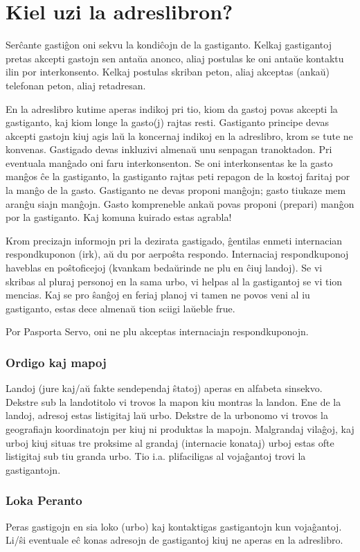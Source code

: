 \section{Kiel uzi la adreslibron?}
Serĉante gastiĝon oni sekvu la kondiĉojn de la gastiganto. Kelkaj gastigantoj pretas
akcepti gastojn sen antaŭa anonco, aliaj postulas ke oni antaŭe kontaktu ilin por
interkonsento. Kelkaj postulas skriban peton, aliaj akceptas (ankaŭ) telefonan
peton, aliaj retadresan.

En la adreslibro kutime aperas indikoj pri tio, kiom da gastoj povas akcepti la
gastiganto, kaj kiom longe la gasto(j) rajtas resti. Gastiganto principe devas akcepti
gastojn kiuj agis laŭ la koncernaj indikoj en la adreslibro, krom se tute ne konvenas.
Gastigado devas inkluzivi almenaŭ unu senpagan tranoktadon. Pri eventuala
manĝado oni faru interkonsenton. Se oni interkonsentas ke la gasto manĝos ĉe
la gastiganto, la gastiganto rajtas peti repagon de la kostoj faritaj por la manĝo
de la gasto. Gastiganto ne devas proponi manĝojn; gasto tiukaze mem aranĝu
siajn manĝojn. Gasto kompreneble ankaŭ povas proponi (prepari) manĝon por la
gastiganto. Kaj komuna kuirado estas agrabla!

Krom precizajn informojn pri la dezirata gastigado, ĝentilas enmeti internacian
respondkuponon (irk), aŭ du por aerpoŝta respondo. Internaciaj respondkuponoj
haveblas en poŝtoficejoj (kvankam bedaŭrinde ne plu en ĉiuj landoj). Se vi skribas
al pluraj personoj en la sama urbo, vi helpas al la gastigantoj se vi tion mencias. Kaj
se pro ŝanĝoj en feriaj planoj vi tamen ne povos veni al iu gastiganto, estas dece
almenaŭ tion sciigi laŭeble frue.

Por Pasporta Servo, oni ne plu akceptas internaciajn respondkuponojn.
\subsubsection{Ordigo kaj mapoj}
Landoj (jure kaj/aŭ fakte sendependaj ŝtatoj) aperas en alfabeta sinsekvo. Dekstre
sub la landotitolo vi trovos la mapon kiu montras la landon.
Ene de la landoj, adresoj estas listigitaj laŭ urbo. Dekstre de la urbonomo vi trovos
la geografiajn koordinatojn per kiuj ni produktas la mapojn. Malgrandaj vilaĝoj, kaj
urboj kiuj situas tre proksime al grandaj (internacie konataj) urboj estas ofte listigitaj
sub tiu granda urbo. Tio i.a. plifaciligas al vojaĝantoj trovi la gastigantojn.
\subsubsection{Loka Peranto}
Peras gastigojn en sia loko (urbo) kaj kontaktigas gastigantojn kun vojaĝantoj.
Li/ŝi eventuale eĉ konas adresojn de gastigantoj kiuj ne aperas en la adreslibro.
